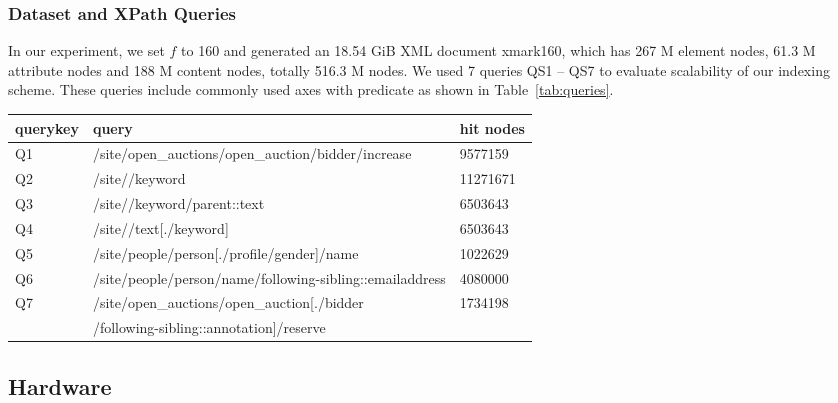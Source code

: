 \subsubsection{Dataset and XPath Queries} 

In our experiment, we set $f$ to 160 and generated an 18.54 GiB XML document
xmark160, which has 267 M element nodes, 61.3 M attribute nodes and 188 M
content nodes, totally 516.3 M nodes. We used 7 queries QS1 -- QS7 to evaluate
scalability of our indexing scheme. These queries include commonly used axes
with predicate as shown in Table~\ref{tab:queries}.


\begin{table*}[ht]
	\centering
	\caption{Queries used for xmark160 dataset.}
	\label{tab:queries}
	\begin{tabular}{|l|l|l|}
		\hline
		querykey & query                                                                                  & hit nodes \\ \hline
		Q1       & /site/open\_auctions/open\_auction/bidder/increase                                     & 9577159   \\ \hline
		Q2       & /site//keyword                                                                         & 11271671  \\ \hline
		Q3       & /site//keyword/parent::text                                                            & 6503643   \\ \hline
		Q4       & /site//text{[}./keyword{]}                                                             & 6503643   \\ \hline
		Q5       & /site/people/person{[}./profile/gender{]}/name                                         & 1022629   \\ \hline
		Q6       & /site/people/person/name/following-sibling::emailaddress                               & 4080000   \\ \hline
		Q7       & /site/open\_auctions/open\_auction{[}./bidder                                          & 1734198   \\ 
		& /following-sibling::annotation{]}/reserve                                              &           \\ \hline
	\end{tabular}
\end{table*}

\subsection{Hardware} 

